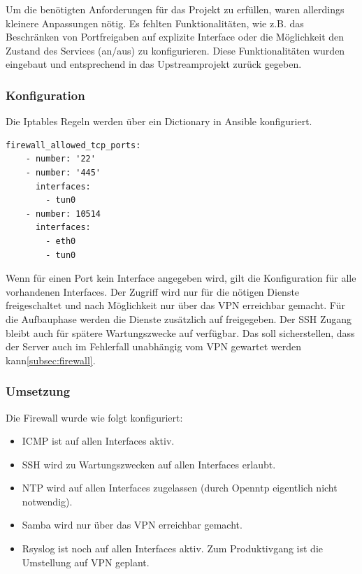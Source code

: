 Um die benötigten Anforderungen für das Projekt zu erfüllen, waren allerdings kleinere Anpassungen nötig. Es fehlten Funktionalitäten, wie z.B. das Beschränken von Portfreigaben auf explizite Interface oder die Möglichkeit den Zustand des Services (an/aus) zu konfigurieren. Diese Funktionalitäten wurden eingebaut und entsprechend in das Upstreamprojekt zurück gegeben.

\subsubsection{Konfiguration}
Die Iptables Regeln werden über ein Dictionary in Ansible konfiguriert.

\begin{lstlisting}[label=code:smbconf5,caption=Auszug aus der Datei ansible/group\_vars/file\_server\_sued/public]
  firewall_allowed_tcp_ports:
    - number: '22'
    - number: '445'
      interfaces:
        - tun0
    - number: 10514
      interfaces:
        - eth0
        - tun0
\end{lstlisting}

Wenn für einen Port kein Interface angegeben wird, gilt die Konfiguration für alle vorhandenen Interfaces. Der Zugriff wird nur für die nötigen Dienste freigeschaltet und nach Möglichkeit nur über das VPN erreichbar gemacht. Für die Aufbauphase werden die Dienste zusätzlich auf  freigegeben. Der SSH Zugang bleibt auch für spätere Wartungszwecke auf  verfügbar. Das soll sicherstellen, dass der Server auch im Fehlerfall unabhängig vom VPN gewartet werden kann\ref{subsec:firewall}.

\subsubsection{Umsetzung}
Die Firewall wurde wie folgt konfiguriert:
\begin{itemize}
\item ICMP ist auf allen Interfaces aktiv.
\item SSH wird zu Wartungszwecken auf allen Interfaces erlaubt.
\item NTP wird auf allen Interfaces zugelassen (durch Openntp eigentlich nicht notwendig).
\item Samba wird nur über das VPN erreichbar gemacht.
\item Rsyslog ist noch auf allen Interfaces aktiv. Zum Produktivgang ist die Umstellung auf VPN geplant.
\end{itemize}

